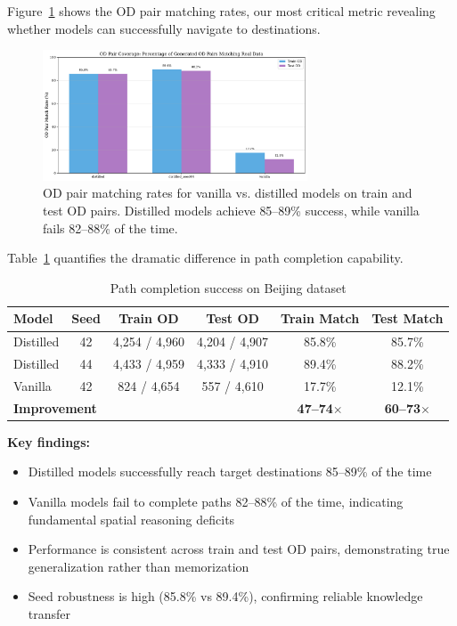 Figure~\ref{fig:od-matching} shows the OD pair matching rates, our most critical metric revealing whether models can successfully navigate to destinations.

\begin{figure}[h]
\centering
\includegraphics[width=0.7\textwidth]{assets/plots/hoser/od_matching_rates.pdf}
\caption{OD pair matching rates for vanilla vs. distilled models on train and test OD pairs. Distilled models achieve 85--89\% success, while vanilla fails 82--88\% of the time.}
\label{fig:od-matching}
\end{figure}

Table~\ref{tab:od-results} quantifies the dramatic difference in path completion capability.

\begin{table}[h]
\centering
\caption{Path completion success on Beijing dataset}
\label{tab:od-results}
\small
\begin{tabular}{lccccc}
\toprule
\textbf{Model} & \textbf{Seed} & \textbf{Train OD} & \textbf{Test OD} & \textbf{Train Match} & \textbf{Test Match} \\
\midrule
Distilled & 42 & 4,254 / 4,960 & 4,204 / 4,907 & 85.8\% & 85.7\% \\
Distilled & 44 & 4,433 / 4,959 & 4,333 / 4,910 & 89.4\% & 88.2\% \\
Vanilla & 42 & 824 / 4,654 & 557 / 4,610 & 17.7\% & 12.1\% \\
\midrule
\multicolumn{4}{l}{\textbf{Improvement}} & \textbf{47--74$\times$} & \textbf{60--73$\times$} \\
\bottomrule
\end{tabular}
\end{table}

\textbf{Key findings:}
\begin{itemize}[noitemsep,topsep=0pt]
\item Distilled models successfully reach target destinations 85--89\% of the time
\item Vanilla models fail to complete paths 82--88\% of the time, indicating fundamental spatial reasoning deficits
\item Performance is consistent across train and test OD pairs, demonstrating true generalization rather than memorization
\item Seed robustness is high (85.8\% vs 89.4\%), confirming reliable knowledge transfer
\end{itemize}

